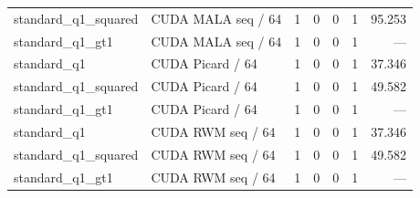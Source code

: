 \documentclass[UTF8,fontset=fandol,a4paper]{ctexart}
\begin{document}
\begin{longtable}{P{28mm}P{40mm}rrrrr}
standard\_\allowbreak{}q1\_\allowbreak{}squared & CUDA MALA seq / 64 & 1 & 0 & 0 & 1 & 95.253 \\
standard\_\allowbreak{}q1\_\allowbreak{}gt1 & CUDA MALA seq / 64 & 1 & 0 & 0 & 1 & — \\
standard\_\allowbreak{}q1 & CUDA Picard / 64 & 1 & 0 & 0 & 1 & 37.346 \\
standard\_\allowbreak{}q1\_\allowbreak{}squared & CUDA Picard / 64 & 1 & 0 & 0 & 1 & 49.582 \\
standard\_\allowbreak{}q1\_\allowbreak{}gt1 & CUDA Picard / 64 & 1 & 0 & 0 & 1 & — \\
standard\_\allowbreak{}q1 & CUDA RWM seq / 64 & 1 & 0 & 0 & 1 & 37.346 \\
standard\_\allowbreak{}q1\_\allowbreak{}squared & CUDA RWM seq / 64 & 1 & 0 & 0 & 1 & 49.582 \\
standard\_\allowbreak{}q1\_\allowbreak{}gt1 & CUDA RWM seq / 64 & 1 & 0 & 0 & 1 & — \\
\bottomrule\end{longtable}\endgroup
\end{document}
